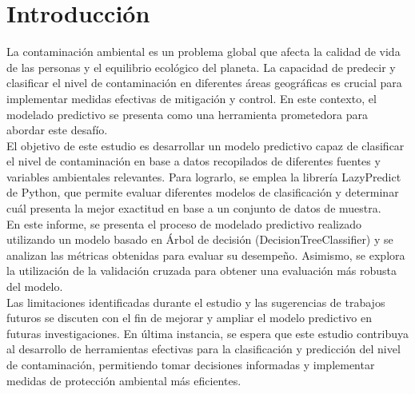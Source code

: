 \section{Introducción}
La contaminación ambiental es un problema global que afecta la calidad de vida de las personas y el equilibrio ecológico del planeta. La capacidad de predecir y clasificar el nivel de contaminación en diferentes áreas geográficas es crucial para implementar medidas efectivas de mitigación y control. En este contexto, el modelado predictivo se presenta como una herramienta prometedora para abordar este desafío.\\

El objetivo de este estudio es desarrollar un modelo predictivo capaz de clasificar el nivel de contaminación en base a datos recopilados de diferentes fuentes y variables ambientales relevantes. Para lograrlo, se emplea la librería LazyPredict de Python, que permite evaluar diferentes modelos de clasificación y determinar cuál presenta la mejor exactitud en base a un conjunto de datos de muestra.\\

En este informe, se presenta el proceso de modelado predictivo realizado utilizando un modelo basado en Árbol de decisión (DecisionTreeClassifier) y se analizan las métricas obtenidas para evaluar su desempeño. Asimismo, se explora la utilización de la validación cruzada para obtener una evaluación más robusta del modelo.\\

Las limitaciones identificadas durante el estudio y las sugerencias de trabajos futuros se discuten con el fin de mejorar y ampliar el modelo predictivo en futuras investigaciones. En última instancia, se espera que este estudio contribuya al desarrollo de herramientas efectivas para la clasificación y predicción del nivel de contaminación, permitiendo tomar decisiones informadas y implementar medidas de protección ambiental más eficientes.\\
